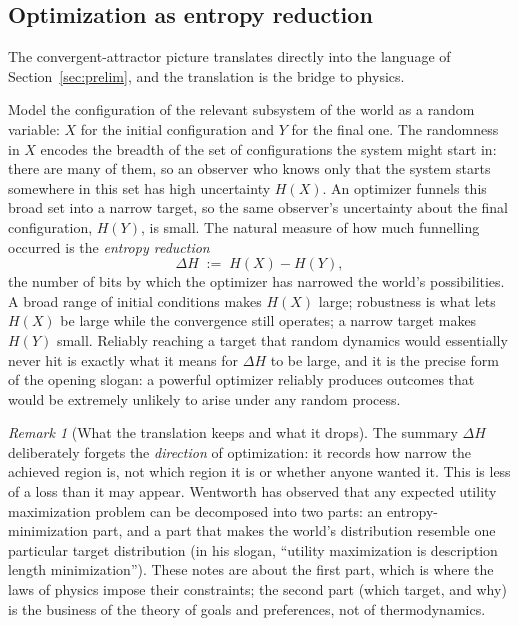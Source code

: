 \documentclass[10pt]{article}
\theoremstyle{definition}
\theoremstyle{remark}
\newtheorem{remark}[theorem]{Remark}
\begin{document}
\subsection{Optimization as entropy reduction}
\label{sec:optentropy}

The convergent-attractor picture translates directly into the language of Section~\ref{sec:prelim}, and the translation is the bridge to physics.

Model the configuration of the relevant subsystem of the world as a random variable: $X$ for the initial configuration and $Y$ for the final one. The randomness in $X$ encodes the breadth of the set of configurations the system might start in: there are many of them, so an observer who knows only that the system starts somewhere in this set has high uncertainty $H(X)$. An optimizer funnels this broad set into a narrow target, so the same observer's uncertainty about the final configuration, $H(Y)$, is small. The natural measure of how much funnelling occurred is the \emph{entropy reduction}
\[
\Delta H \;:=\; H(X) - H(Y),
\]
the number of bits by which the optimizer has narrowed the world's possibilities. A broad range of initial conditions makes $H(X)$ large; robustness is what lets $H(X)$ be large while the convergence still operates; a narrow target makes $H(Y)$ small. Reliably reaching a target that random dynamics would essentially never hit is exactly what it means for $\Delta H$ to be large, and it is the precise form of the opening slogan: a powerful optimizer reliably produces outcomes that would be extremely unlikely to arise under any random process.

\begin{remark}[What the translation keeps and what it drops]
\label{rem:translation}
The summary $\Delta H$ deliberately forgets the \emph{direction} of optimization: it records how narrow the achieved region is, not which region it is or whether anyone wanted it. This is less of a loss than it may appear. Wentworth has observed that any expected utility maximization problem can be decomposed into two parts: an entropy-minimization part, and a part that makes the world's distribution resemble one particular target distribution (in his slogan, ``utility maximization is description length minimization''). These notes are about the first part, which is where the laws of physics impose their constraints; the second part (which target, and why) is the business of the theory of goals and preferences, not of thermodynamics.
\end{remark}
\end{document}
